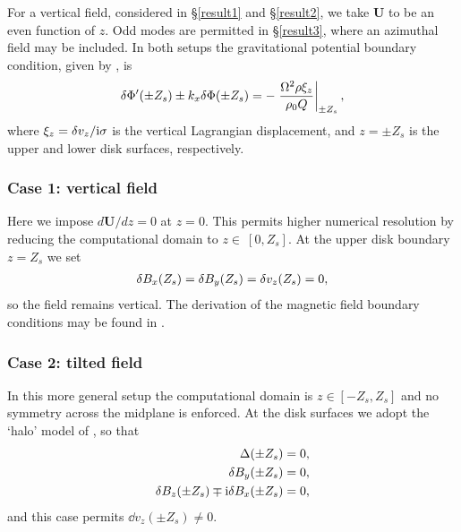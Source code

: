 For a vertical field, considered in \S\ref{result1} and
\S\ref{result2}, we take $\bm{U}$ to be an even function of
$z$. Odd modes are permitted in \S\ref{result3}, where an azimuthal field may
be included. In both
setups the gravitational potential boundary condition, given by
\cite{goldreich65a}, is
\begin{align}
  \delta \Phi^\prime(\pm Z_s) \pm k_x\delta \Phi(\pm Z_s) =  - \left. \frac{\Omega^2
    \rho \xi_z}{\rho_0Q}\right|_{\pm Z_s}, \label{pot_bc2}
\end{align}
where $\xi_z=\delta v_z/\mathrm{i}\sigma$ is the vertical Lagrangian
displacement, and $z=\pm Z_s$ is the upper and lower disk surfaces,
respectively. 


\subsubsection{Case 1: vertical field}
 Here we impose $d\bm{U}/dz=0$ at $z=0$. This permits higher
numerical resolution by reducing the computational domain to
$z\in~[0,Z_s]$. At the upper disk boundary $z=Z_s$ we set  
\begin{align}
  \delta B_x(Z_s) = \delta B_y(Z_s) = \delta v_z (Z_s) = 0, 
\end{align}
so the field remains vertical. The derivation of the magnetic
  field boundary conditions may be found in \cite{sano99}.

\subsubsection{Case 2: tilted field} 
In this more general setup the computational domain is
$z\in[-Z_s, Z_s]$ and no symmetry across the midplane is
  enforced. At the disk surfaces we adopt the `halo' model of
\cite{gammie94}, so that
\begin{align}
  \Delta(\pm Z_s) & = 0, \\
  \delta B_y(\pm Z_s) & = 0,\\
  \delta B_z(\pm Z_s) \mp \mathrm{i} \delta B_x(\pm Z_s) &= 0,
\end{align}
     and this case permits $\dd v_z(\pm Z_s)\neq0$.
    
